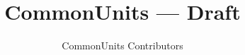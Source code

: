 \documentclass[a4paper]{report}
\title{CommonUnits --- Draft}
\author{CommonUnits Contributors}
\begin{document}
\begin{titlepage}
\maketitle
\thispagestyle{empty}
\end{titlepage}

\tableofcontents
  
  
  
\end{document}
